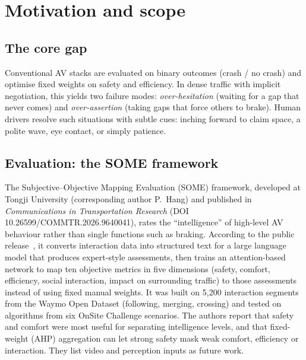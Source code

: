 \documentclass[11pt,a4paper]{article}
\begin{document}
\begin{abstract}
(vi)~A dense-perception module adds per-pixel semantic segmentation (road, sidewalk, building/vegetation, sky, dynamic) and single-image depth, using a U-Net written from scratch in NumPy because no deep-learning framework or pretrained weights were available. On eight held-out hand-labelled frames it reaches 49.1\% mIoU against 40.9\% for gradient boosting and 36.0\% for a position prior (intervals overlap); for depth, trained on labels derived from the ego-motion in the video, it is only marginally better than a row-wise prior (AbsRel 0.442 against 0.447; gradient boosting is best at 0.392). A free-space-range signal derived from both outputs correlates with the human driver's speed ($\rho=0.40$). Labels are approximate and the data come from a single drive.
\end{abstract}

\section{Motivation and scope}
\subsection*{The core gap}
Conventional AV stacks are evaluated on binary outcomes (crash / no crash) and optimise fixed weights on safety and efficiency. In dense traffic with implicit negotiation, this yields two failure modes: \emph{over-hesitation} (waiting for a gap that never comes) and \emph{over-assertion} (taking gaps that force others to brake). Human drivers resolve such situations with subtle cues: inching forward to claim space, a polite wave, eye contact, or simply patience.

\subsection*{Evaluation: the SOME framework}
The Subjective--Objective Mapping Evaluation (SOME) framework, developed at Tongji University (corresponding author P.~Hang) and published in \emph{Communications in Transportation Research} (DOI 10.26599/COMMTR.2026.9640041), rates the ``intelligence'' of high-level AV behaviour rather than single functions such as braking. According to the public release~\cite{some}, it converts interaction data into structured text for a large language model that produces expert-style assessments, then trains an attention-based network to map ten objective metrics in five dimensions (safety, comfort, efficiency, social interaction, impact on surrounding traffic) to those assessments instead of using fixed manual weights. It was built on 5{,}200 interaction segments from the Waymo Open Dataset (following, merging, crossing) and tested on algorithms from six OnSite Challenge scenarios. The authors report that safety and comfort were most useful for separating intelligence levels, and that fixed-weight (AHP) aggregation can let strong safety mask weak comfort, efficiency or interaction. They list video and perception inputs as future work.
\end{document}
